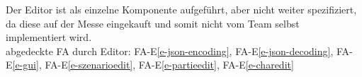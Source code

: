 Der Editor ist als einzelne Komponente aufgeführt, aber nicht weiter spezifiziert, da diese auf der Messe eingekauft und somit nicht vom Team selbst implementiert wird.\\ 
abgedeckte FA durch Editor: FA-E\ref{e-json-encoding}, FA-E\ref{e-json-decoding}, FA-E\ref{e-gui}, FA-E\ref{e-szenarioedit}, FA-E\ref{e-partieedit}, FA-E\ref{e-charedit}\\
